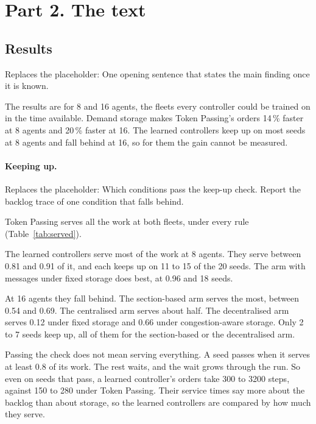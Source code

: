 \documentclass[11pt,a4paper]{article}
\newcommand{\placeholder}[1]{\textcolor{plc}{\small Replaces the placeholder: #1}\par}
\begin{document}
\section*{Part 2. The text}

\subsection*{Results}

\placeholder{One opening sentence that states the main finding once it is known.}
The results are for 8 and 16 agents, the fleets every controller could be trained on in the time
available. Demand storage makes Token Passing's orders 14\,\% faster at 8 agents and 20\,\% faster at
16. The learned controllers keep up on most seeds at 8 agents and fall behind at 16, so for them
the gain cannot be measured.

\paragraph{Keeping up.}
\placeholder{Which conditions pass the keep-up check. Report the backlog trace of one condition that
falls behind.}
Token Passing serves all the work at both fleets, under every rule (Table~\ref{tab:served}).

The learned controllers serve most of the work at 8 agents. They serve between 0.81 and 0.91 of it,
and each keeps up on 11 to 15 of the 20 seeds. The arm with messages under fixed storage does best,
at 0.96 and 18 seeds.

At 16 agents they fall behind. The section-based arm serves the most, between 0.54 and 0.69. The
centralised arm serves about half. The decentralised arm serves 0.12 under fixed storage and 0.66
under congestion-aware storage. Only 2 to 7 seeds keep up, all of them for the section-based or the
decentralised arm.

Passing the check does not mean serving everything. A seed passes when it serves at least 0.8 of
its work. The rest waits, and the wait grows through the run. So even on seeds that pass, a learned
controller's orders take 300 to 3200 steps, against 150 to 280 under Token Passing. Their service
times say more about the backlog than about storage, so the learned controllers are compared by how
much they serve.
\end{document}
